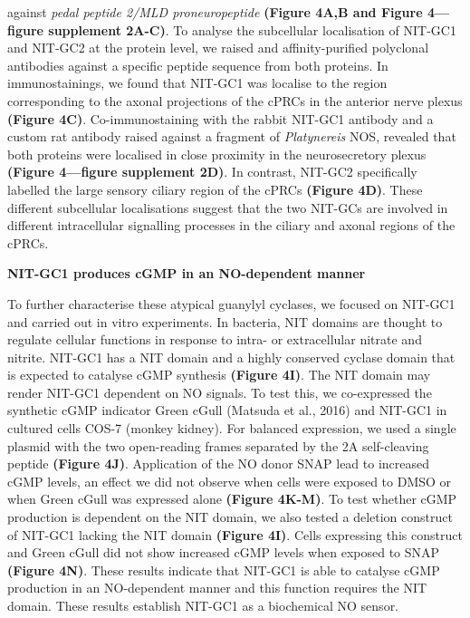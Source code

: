 \documentclass[
  10pt,
  onecolumn]{article}
\begin{document}
against \emph{pedal peptide 2/MLD proneuropeptide} \textbf{(Figure 4A,B
and Figure 4---figure supplement 2A-C)}. To analyse the subcellular
localisation of NIT-GC1 and NIT-GC2 at the protein level, we raised and
affinity-purified polyclonal antibodies against a specific peptide
sequence from both proteins. In immunostainings, we found that NIT-GC1
was localise to the region corresponding to the axonal projections of
the cPRCs in the anterior nerve plexus \textbf{(Figure 4C)}.
Co-immunostaining with the rabbit NIT-GC1 antibody and a custom rat
antibody raised against a fragment of \emph{Platynereis} NOS, revealed
that both proteins were localised in close proximity in the
neurosecretory plexus \textbf{(Figure 4---figure supplement 2D)}. In
contrast, NIT-GC2 specifically labelled the large sensory ciliary region
of the cPRCs \textbf{(Figure 4D)}. These different subcellular
localisations suggest that the two NIT-GCs are involved in different
intracellular signalling processes in the ciliary and axonal regions of
the cPRCs.

\textbf{NIT-GC1 produces cGMP in an NO-dependent manner}

To further characterise these atypical guanylyl cyclases, we focused on
NIT-GC1 and carried out in vitro experiments. In bacteria, NIT domains
are thought to regulate cellular functions in response to intra- or
extracellular nitrate and nitrite. NIT-GC1 has a NIT domain and a highly
conserved cyclase domain that is expected to catalyse cGMP synthesis
\textbf{(Figure 4I)}. The NIT domain may render NIT-GC1 dependent on NO
signals. To test this, we co-expressed the synthetic cGMP indicator
Green cGull (Matsuda et al., 2016) and NIT-GC1 in cultured cells COS-7
(monkey kidney). For balanced expression, we used a single plasmid with
the two open-reading frames separated by the 2A self-cleaving peptide
\textbf{(Figure 4J)}. Application of the NO donor SNAP lead to increased
cGMP levels, an effect we did not observe when cells were exposed to
DMSO or when Green cGull was expressed alone \textbf{(Figure 4K-M)}. To
test whether cGMP production is dependent on the NIT domain, we also
tested a deletion construct of NIT-GC1 lacking the NIT domain
\textbf{(Figure 4I)}. Cells expressing this construct and Green cGull
did not show increased cGMP levels when exposed to SNAP \textbf{(Figure
4N)}. These results indicate that NIT-GC1 is able to catalyse cGMP
production in an NO-dependent manner and this function requires the NIT
domain. These results establish NIT-GC1 as a biochemical NO sensor.
\end{document}

